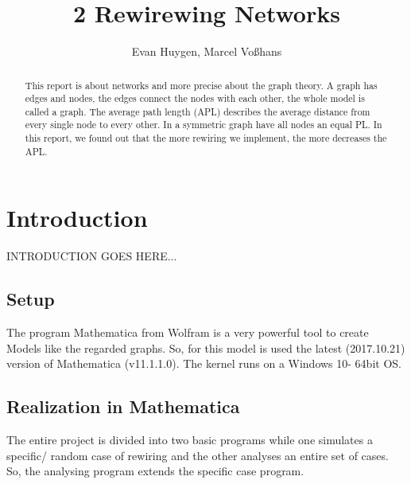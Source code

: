 \documentclass[11pt,a4paper]{article}
\begin{document}
\title{2 Rewirewing Networks}
\author{Evan Huygen, Marcel Vo{\ss}hans}
\maketitle

\begin{abstract}
This report is about networks and more precise about the graph theory. A graph has edges and nodes, the edges connect the nodes with each other, the whole model is called a graph. The average path length (APL) describes the average distance from every single node to every other. In a symmetric graph have all nodes an equal PL. In this report, we found out that the more rewiring we implement, the more decreases the APL.
\end{abstract}

\tableofcontents

\section{Introduction}
INTRODUCTION GOES HERE...
 \subsection{Setup}
The program Mathematica from Wolfram is a very powerful tool to create Models like the regarded graphs. So, for this model is used the latest (2017.10.21) version of Mathematica (v11.1.1.0). The kernel runs on a Windows 10- 64bit OS.
 \subsection{Realization in Mathematica}
The entire project is divided into two basic programs while one simulates a specific/ random case of rewiring and the other analyses an entire set of cases. So, the analysing program extends the specific case program. 
\end{document}
